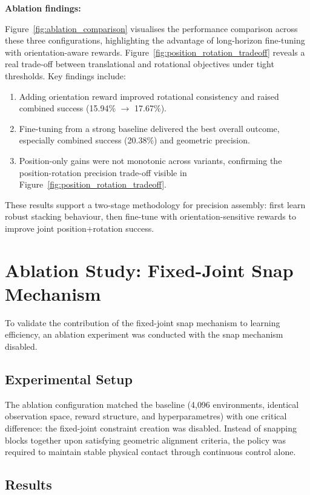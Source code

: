\documentclass[12pt,a4paper,oneside]{report}
\begin{document}
\textbf{Ablation findings:}

Figure~\ref{fig:ablation_comparison} visualises the performance comparison across these three configurations, highlighting the advantage of long-horizon fine-tuning with orientation-aware rewards. Figure~\ref{fig:position_rotation_tradeoff} reveals a real trade-off between translational and rotational objectives under tight thresholds. Key findings include:

\begin{enumerate}
    \item Adding orientation reward improved rotational consistency and raised combined success (15.94\% $\rightarrow$ 17.67\%).
    \item Fine-tuning from a strong baseline delivered the best overall outcome, especially combined success (20.38\%) and geometric precision.
    \item Position-only gains were not monotonic across variants, confirming the position-rotation precision trade-off visible in Figure~\ref{fig:position_rotation_tradeoff}.
\end{enumerate}

These results support a two-stage methodology for precision assembly: first learn robust stacking behaviour, then fine-tune with orientation-sensitive rewards to improve joint position+rotation success.

\section{Ablation Study: Fixed-Joint Snap Mechanism}

To validate the contribution of the fixed-joint snap mechanism to learning efficiency, an ablation experiment was conducted with the snap mechanism disabled.

\subsection{Experimental Setup}

The ablation configuration matched the baseline (4{,}096 environments, identical observation space, reward structure, and hyperparametres) with one critical difference: the fixed-joint constraint creation was disabled. Instead of snapping blocks together upon satisfying geometric alignment criteria, the policy was required to maintain stable physical contact through continuous control alone.

\subsection{Results}
\end{document}
